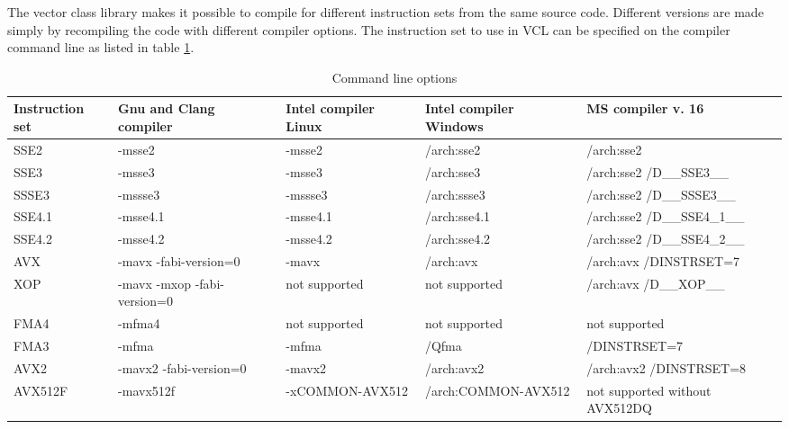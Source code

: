 \documentclass[vcl_manual.tex]{subfiles}
\begin{document}
The vector class library makes it possible to compile for different instruction sets from the same source code. Different versions are made simply by recompiling the code with different compiler options. The instruction set to use in VCL can be specified on the compiler command line as listed in table \ref{table:CommandLineOptions}.

\begin {table}[h]
\caption{Command line options}
\label{table:CommandLineOptions}
\begin{tabular}{|p{26mm}|p{28mm}|p{28mm}|p{28mm}|p{28mm}|}
\hline
\bfseries Instruction set & \bfseries Gnu and Clang compiler & \bfseries Intel compiler Linux & \bfseries Intel compiler Windows & \bfseries MS compiler v. 16\\ \hline

SSE2 & -msse2 & -msse2 & /arch:sse2 & /arch:sse2 \\ \hline
SSE3 & -msse3 & -msse3 & /arch:sse3 & /arch:sse2 \newline /D\_\_SSE3\_\_ \\ \hline
SSSE3 & -mssse3 & -mssse3 & /arch:ssse3 & /arch:sse2 \newline /D\_\_SSSE3\_\_ \\ \hline
SSE4.1 & -msse4.1 & -msse4.1 & /arch:sse4.1 & /arch:sse2 \newline /D\_\_SSE4\_1\_\_ \\ \hline
SSE4.2 & -msse4.2 & -msse4.2 & /arch:sse4.2 & /arch:sse2 \newline /D\_\_SSE4\_2\_\_ \\ \hline
AVX & -mavx \newline -fabi-version=0 & -mavx & /arch:avx & /arch:avx /DINSTRSET=7 \\ \hline
XOP & -mavx \newline -mxop \newline -fabi-version=0 & not supported & not supported & /arch:avx \newline /D\_\_XOP\_\_ \\ \hline
FMA4 & -mfma4 & not supported & not supported & not supported \\ \hline
FMA3 & -mfma & -mfma & /Qfma & /DINSTRSET=7 \\ \hline
AVX2 & -mavx2 \newline -fabi-version=0 & -mavx2 & /arch:avx2 & /arch:avx2 \newline /DINSTRSET=8 \\ \hline
AVX512F & -mavx512f & -xCOMMON-AVX512 & /arch:COMMON-AVX512 & not supported without AVX512DQ\\ \hline


\end{tabular}
\end{table}
\end{document}
